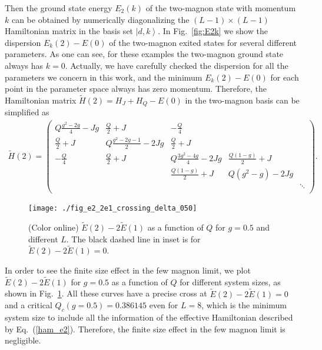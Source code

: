 \documentclass[article,10pt,onecolumn,superscriptaddress,floatfix]{revtex4}
\begin{document}
Then the ground state energy $E_2(k)$ of the two-magnon state with momentum $k$ can be obtained by numerically diagonalizing the $(L-1)\times(L-1)$ Hamiltonian matrix in the basis set $\left|d,k\right\rangle$. In Fig.~\ref{fig:E2k} we show the dispersion $E_k(2)-E(0)$ of the two-magnon exited states for several different parameters. As one can see, for these examples the two-magnon ground state always has $k=0$. Actually, we have carefully checked the dispersion for all the parameters we concern in this work, and the minimum $E_k(2)-E(0)$ for each point in the parameter space always has zero momentum. Therefore, the Hamiltonian matrix $\tilde{H}(2)=H_J+H_Q-E(0)$ in the two-magnon basis can be simplified as
\begin{align}
\tilde{H}(2) =	\begin{pmatrix}
Q\frac{g^{2}-2g}{4}-Jg & \frac{Q}{2}+J & -\frac{Q}{4} &\\
\frac{Q}{2}+J & Q\frac{g^{2}-2g-1}{2}-2Jg & \frac{Q}{2}+J &\\
-\frac{Q}{4} & \frac{Q}{2}+J & Q\frac{3g^{2}-4g}{4}-2Jg & \frac{Q\left(1-g\right)}{2}+J &\\
&  & \frac{Q\left(1-g\right)}{2}+J & Q\left(g^{2}-g\right)-2Jg & \\
&  &  &  &\ddots\\
\end{pmatrix}.
\label{ham_e2}
\end{align}

\begin{flushleft}
	\begin{figure}[!tb] %
		\centering
		\texttt{[image: ./fig\_e2\_2e1\_crossing\_delta\_050]}
		\caption{ (Color online) $\tilde{E}(2)-2\tilde{E}(1)$  as a function of $Q$ for $g=0.5$ and different $L$. The black dashed line in inset is for $\tilde{E}(2)-2\tilde{E}(1)=0$.}%
		\label{fig:e1e2_finite_size}
	\end{figure}
\end{flushleft}

In order to see the finite size effect in the few magnon limit, we plot $\tilde{E}(2)-2\tilde{E}(1)$ for $g=0.5$ as a function of $Q$ for different system sizes, as shown in Fig.~\ref{fig:e1e2_finite_size}. All these curves have a precise cross at $\tilde{E}(2)-2\tilde{E}(1)=0$ and a critical $Q_c{(g=0.5)}=0.386145$ even for $L=8$, which is the minimum system size to include all the information of the effective Hamiltonian described by Eq.~(\ref{ham_e2}). Therefore, the finite size effect in the few magnon limit is negligible.
\end{document}
